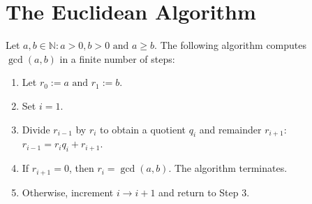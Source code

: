 \section{The Euclidean Algorithm}

\begin{theorem}
Let $a, b \in \mathbb{N} : a > 0, b > 0 \text{ and } a \geq b$. The following algorithm computes $\gcd(a, b)$ in a finite number of steps:
\begin{enumerate}
    \item Let $r_0 := a \text{ and } r_1 := b$.
    \item Set $i = 1$.
    \item Divide $r_{i-1}$ by $r_i$ to obtain a quotient $q_i$ and remainder $r_{i+1}$: $r_{i-1} = r_i q_i + r_{i+1}$.
    \item If $r_{i+1} = 0$, then $r_i = \gcd(a, b)$. The algorithm terminates.
    \item Otherwise, increment $i \rightarrow i+1$ and return to Step 3.
\end{enumerate}
\end{theorem}
